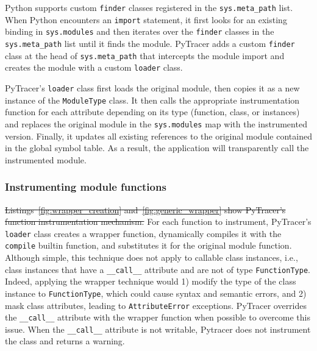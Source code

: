 \documentclass[10pt,journal,compsoc]{IEEEtran}
\newcommand{\pytracer}[0]{PyTracer\xspace}
\DeclareRobustCommand{\remove}[1]{\textcolor{lightred}{\sout{#1}}}
\DeclareRobustCommand{\remove}[1]{}
\begin{document}
Python supports custom \texttt{finder} classes registered in the
\texttt{sys.meta\_path} list. When Python encounters an \texttt{import}
statement, it first looks for an existing binding in \texttt{sys.modules} and
then iterates over the \texttt{finder} classes in the \texttt{sys.meta\_path}
list until it finds the module. \pytracer adds a custom \texttt{finder} class at
the head of \texttt{sys.meta\_path} that intercepts the module import and
creates the module with a custom \texttt{loader} class.

\pytracer's \texttt{loader} class first loads the original module, then copies
it as a new instance of the \texttt{ModuleType} class. It then calls the
appropriate instrumentation function for each attribute depending on its type
(function, class, or instances) and replaces the original module in the
\texttt{sys.modules} map with the instrumented version. Finally, it updates all
existing references to the original module contained in the global symbol table.
As a result, the application will transparently call the instrumented module.

\subsubsection{Instrumenting module functions}

\remove{Listings~\mbox{\ref{fig:wrapper_creation}} and~\mbox{\ref{fig:generic_wrapper}} show
    \mbox{\pytracer}'s function instrumentation mechanism.}
For each function to instrument, \pytracer's \texttt{loader} class creates a
wrapper function, dynamically compiles it with the \texttt{compile} builtin
function, and substitutes it for the original module function.  Although simple,
this technique does not apply to callable class instances, i.e., class instances
that have a \texttt{\_\_call\_\_} attribute and are not of type
\texttt{FunctionType}. Indeed, applying the wrapper technique would 1) modify
the type of the class instance to \texttt{FunctionType}, which could cause
syntax and semantic errors, and 2) mask class attributes, leading to
\texttt{AttributeError} exceptions. \pytracer overrides the
\texttt{\_\_call\_\_} attribute with the wrapper function when possible to
overcome this issue. When the \texttt{\_\_call\_\_} attribute is not writable,
Pytracer does not instrument the class and returns a warning. 

\end{document}
